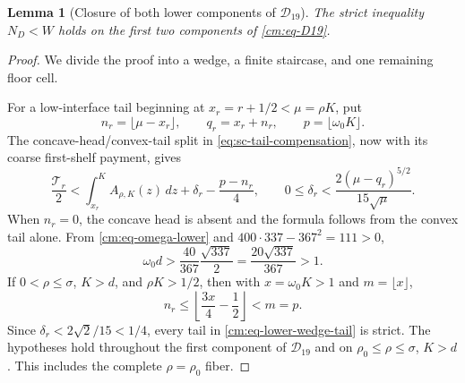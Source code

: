\documentclass[11pt]{article}
\numberwithin{equation}{section}
\newtheorem{lemma}[theorem]{Lemma}
\theoremstyle{definition}
\theoremstyle{remark}
\begin{document}
\begin{lemma}[Closure of both lower components of \(\mathcal D_{19}\)]
\label{cm:lem-lower-closure}
The strict inequality \(N_D<W\) holds on the first two components of
\eqref{cm:eq-D19}.
\end{lemma}

\begin{proof}
We divide the proof into a wedge, a finite staircase, and one remaining
floor cell.

For a low-interface tail beginning at \(x_r=r+1/2<\mu=\rho K\), put
\[
 n_r=\lfloor\mu-x_r\rfloor,\qquad
 q_r=x_r+n_r,\qquad p=\lfloor\omega_0K\rfloor.
\]
The concave-head/convex-tail split in
\eqref{eq:sc-tail-compensation}, now with its coarse first-shelf payment,
gives
\begin{equation}
 \frac{\mathcal T_r}{2}
 <\int_{x_r}^K A_{\rho,K}(z)\,dz
 +\delta_r-\frac{p-n_r}{4},
 \qquad
 0\leq\delta_r<
 \frac{2(\mu-q_r)^{5/2}}{15\sqrt\mu}.
 \label{cm:eq-lower-wedge-tail}
\end{equation}
When \(n_r=0\), the concave head is absent and the formula follows from
the convex tail alone.  From \eqref{cm:eq-omega-lower} and
\(400\cdot337-367^2=111>0\),
\[
 \omega_0d>
 \frac{40}{367}\frac{\sqrt{337}}2
 =\frac{20\sqrt{337}}{367}>1.
\]
If
\(0<\rho\leq\sigma\), \(K>d\), and \(\rho K>1/2\), then with
\(x=\omega_0K>1\) and \(m=\lfloor x\rfloor\),
\[
 n_r\leq\left\lfloor\frac{3x}{4}-\frac12\right\rfloor<m=p.
\]
Since \(\delta_r<2\sqrt2/15<1/4\), every tail in
\eqref{cm:eq-lower-wedge-tail} is strict.  The hypotheses hold throughout
the first component of \(\mathcal D_{19}\) and on
\(\rho_0\leq\rho\leq\sigma\), \(K>d\).  This includes the complete
\(\rho=\rho_0\) fiber.


\end{proof}
\end{document}
